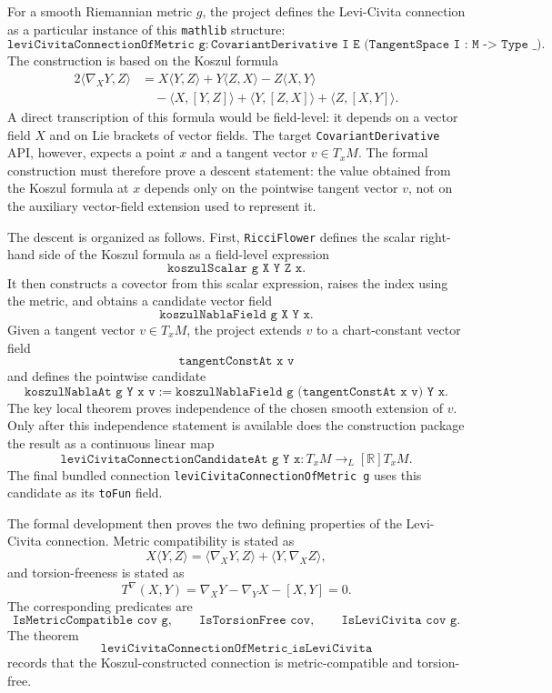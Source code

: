 \documentclass[11pt]{article}
\theoremstyle{plain}
\theoremstyle{definition}
\theoremstyle{remark}
\begin{document}
For a smooth Riemannian metric $g$, the project defines the Levi-Civita
connection as a particular instance of this \texttt{mathlib} structure:
\[
  \texttt{leviCivitaConnectionOfMetric g}
  :
  \texttt{CovariantDerivative I E (TangentSpace I : M -> Type \_)} .
\]
The construction is based on the Koszul formula
\[
\begin{aligned}
2\langle \nabla_XY,Z\rangle
&=
X\langle Y,Z\rangle
+
Y\langle Z,X\rangle
-
Z\langle X,Y\rangle                                      \\
&\quad
-\langle X,[Y,Z]\rangle
+
\langle Y,[Z,X]\rangle
+
\langle Z,[X,Y]\rangle .
\end{aligned}
\]
A direct transcription of this formula would be field-level: it depends on a
vector field $X$ and on Lie brackets of vector fields.  The target
\texttt{CovariantDerivative} API, however, expects a point $x$ and a tangent
vector $v\in T_xM$.  The formal construction must therefore prove a descent
statement: the value obtained from the Koszul formula at $x$ depends only on the
pointwise tangent vector $v$, not on the auxiliary vector-field extension used
to represent it.

The descent is organized as follows.  First, \texttt{RicciFlower} defines the
scalar right-hand side of the Koszul formula as a field-level expression
\[
  \texttt{koszulScalar g X Y Z x}.
\]
It then constructs a covector from this scalar expression, raises the index
using the metric, and obtains a candidate vector field
\[
  \texttt{koszulNablaField g X Y x}.
\]
Given a tangent vector $v\in T_xM$, the project extends $v$ to a
chart-constant vector field
\[
  \texttt{tangentConstAt x v}
\]
and defines the pointwise candidate
\[
  \texttt{koszulNablaAt g Y x v}
  :=
  \texttt{koszulNablaField g (tangentConstAt x v) Y x}.
\]
The key local theorem proves independence of the chosen smooth extension of
$v$.  Only after this independence statement is available does the construction
package the result as a continuous linear map
\[
  \texttt{leviCivitaConnectionCandidateAt g Y x}
  :
  T_xM \to _L[\mathbb R] T_xM .
\]
The final bundled connection \texttt{leviCivitaConnectionOfMetric g} uses this
candidate as its \texttt{toFun} field.

The formal development then proves the two defining properties of the
Levi-Civita connection.  Metric compatibility is stated as
\[
  X\langle Y,Z\rangle
  =
  \langle \nabla_XY,Z\rangle
  +
  \langle Y,\nabla_XZ\rangle,
\]
and torsion-freeness is stated as
\[
  T^\nabla(X,Y)
  =
  \nabla_XY-\nabla_YX-[X,Y]
  =
  0.
\]
The corresponding predicates are
\[
  \texttt{IsMetricCompatible cov g},
  \qquad
  \texttt{IsTorsionFree cov},
  \qquad
  \texttt{IsLeviCivita cov g}.
\]
The theorem
\[
  \texttt{leviCivitaConnectionOfMetric\_isLeviCivita}
\]
records that the Koszul-constructed connection is metric-compatible and
torsion-free.
\end{document}
